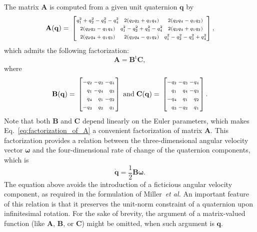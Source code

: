 \documentclass[aip,jcp,reprint,amsmath,amssymb]{revtex4-1}
\makeatletter
\newcommand{\mt}[1]{\boldsymbol{\mathbf{#1}}}           %
\newcommand{\vt}[1]{\boldsymbol{\mathbf{#1}}}           %
\newcommand{\tr}[1]{#1^\text{t}}                        %
\newenvironment{smallarray}[1]                          %
{\null\,\vcenter\bgroup\scriptsize
	\renewcommand{\arraystretch}{1.5}
	\arraycolsep=.13885em
	\hbox\bgroup$\left[\array{@{}#1@{}}}
{\endarray\right]$\egroup\egroup\,\null}
\makeatother
\begin{document}
The matrix $\mt A$ is computed from a given unit quaternion $\vt q$ by\cite{Allen1989,Miller2002}
\begin{equation*}
\label{eq:A_from_q}
\mt A(\vt q) = \begin{smallarray}{ccc}
q_1^2 + q_2^2 - q_3^2 - q_4^2 & 2(q_2 q_3 + q_1 q_4) & 2(q_2 q_4 - q_1 q_3) \\
2(q_2 q_3 - q_1 q_4) & q_1^2 - q_2^2 + q_3^2 - q_4^2 & 2(q_3 q_4 + q_1 q_2) \\
2(q_2 q_4 + q_1 q_3) & 2(q_3 q_4 - q_1 q_2) & q_1^2 - q_2^2 - q_3^2 + q_4^2  
\end{smallarray},
\end{equation*}
which admits the following factorization:
\begin{equation}
\label{eq:factorization_of_A}
{\mt A} = \tr{\mt B}{\mt C},
\end{equation} 
where
\begin{equation}
\label{eq:def_B_and_C}
\mt B(\vt q) = \begin{smallarray}{rrrr}
-q_2 & -q_3 & -q_4 \\
 q_1 & -q_4 &  q_3 \\
 q_4 &  q_1 & -q_2 \\
-q_3 &  q_2 &  q_1
\end{smallarray}
\; \text{and} \;
\mt C(\vt q) = \begin{smallarray}{rrrr}
-q_2 & -q_3 & -q_4 \\
 q_1 &  q_4 & -q_3 \\
-q_4 &  q_1 &  q_2 \\
 q_3 & -q_2 &  q_1
\end{smallarray}.
\end{equation}
Note that both $\mt B$ and $\mt C$ depend linearly on the Euler parameters, which makes Eq.~\eqref{eq:factorization_of_A} a convenient factorization of matrix $\mt A$. This factorization provides a relation between the three-dimensional angular velocity vector $\vt \omega$ and the four-dimensional rate of change of the quaternion components, which is
\begin{equation}
\label{eq:relation_qdot_omega}
\dot{\vt q} = \frac{1}{2} \mt B \vt \omega.
\end{equation}
The equation above avoids the introduction of a ficticious angular velocity component, as required in the formulation of Miller~\textit{et al.}\cite{Miller2002} An important feature of this relation is that it preserves the unit-norm constraint of a quaternion upon infinitesimal rotation. For the sake of brevity, the argument of a matrix-valued function (like $\mt A$, $\vt B$, or $\mt C$) might be omitted, when such argument is $\vt q$.
\end{document}
